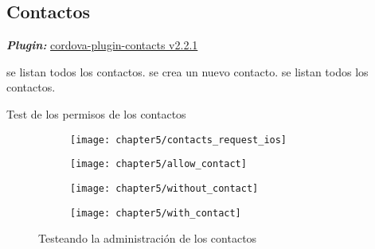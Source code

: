 \subsection*{Contactos}
\textbf{\emph{Plugin:}} \href{https://www.npmjs.com/package/cordova-plugin-contacts}{cordova-plugin-contacts v2.2.1}
\begin{algorithm}
	\begin{algorithmic}[1]
		\STATE se listan todos los contactos.
		\STATE se crea un nuevo contacto.
		\STATE se listan todos los contactos.
	\end{algorithmic}
	\caption{Test de los permisos de los contactos}\label{alg:chap5:test_contactos}
\end{algorithm}
\begin{figure}[!ht]
	\begin{subfigure}{.24\textwidth}
	    \centering
		\texttt{[image: chapter5/contacts\_request\_ios]}
		\label{fig:chapter05:allow_contact_ios}
	\end{subfigure}
	\begin{subfigure}{.24\textwidth}
	    \centering
		\texttt{[image: chapter5/allow\_contact]}
		\label{fig:chapter05:allow_contact_android}
	\end{subfigure}		
	\begin{subfigure}{.25\textwidth}
	    \centering
		\texttt{[image: chapter5/without\_contact]}
		\label{fig:chapter05:without_contact}
	\end{subfigure}
	\begin{subfigure}{.25\textwidth}
	    \centering
		\texttt{[image: chapter5/with\_contact]}
		\label{fig:chapter05:with_contact}
	\end{subfigure}
	\caption{Testeando la administraci\'on de los contactos}
	\label{fig:chapter05:contact_test}
\end{figure}
\newpage

